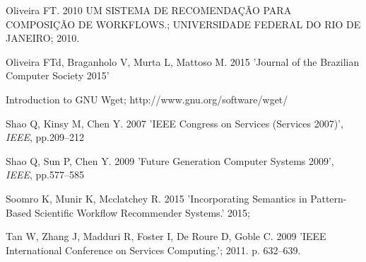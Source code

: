 \documentclass{doublecol-new}
\def\newblock{\hskip .11em plus .33em minus .07em}
\theoremstyle{TH}{
\newtheorem{lemma}{Lemma}
\newtheorem{theorem}[lemma]{Theorem}
\newtheorem{corrolary}[lemma]{Corrolary}
\newtheorem{conjecture}[lemma]{Conjecture}
\newtheorem{proposition}[lemma]{Proposition}
\newtheorem{claim}[lemma]{Claim}
\newtheorem{stheorem}[lemma]{Wrong Theorem}
\newtheorem{algorithm}{Algorithm}
}
\theoremstyle{THrm}{
\newtheorem{definition}{Definition}[section]
\newtheorem{question}{Question}[section]
\newtheorem{remark}{Remark}
\newtheorem{scheme}{Scheme}
}
\theoremstyle{THhit}{
\newtheorem{case}{Case}[section]
}
\begin{document}
\begin{thebibliography}{10}
Oliveira FT. {2010} UM SISTEMA DE RECOMENDAÇÃO PARA COMPOSIÇÃO DE WORKFLOWS.; UNIVERSIDADE FEDERAL DO RIO DE JANEIRO; 2010.


Oliveira FTd, Braganholo V, Murta L, Mattoso M. {2015} 'Journal of the Brazilian Computer Society 2015'


Introduction to GNU Wget; http://www.gnu.org/software/wget/


Shao Q, Kinsy M, Chen Y. {2007} 'IEEE Congress on Services (Services 2007)', {\it IEEE}, pp.209--212


Shao Q, Sun P, Chen Y. {2009} 'Future Generation Computer Systems 2009', {\it IEEE}, pp.577--585


Soomro K, Munir K, Mcclatchey R. {2015} 'Incorporating Semantics in Pattern-Based Scientific Workflow
Recommender Systems.' 2015;


Tan W, Zhang J, Madduri R, Foster I, {De Roure} D, Goble C. {2009} 'IEEE International Conference on Services Computing.';
2011. p. 632--639. 



\end{thebibliography}
\end{document}
